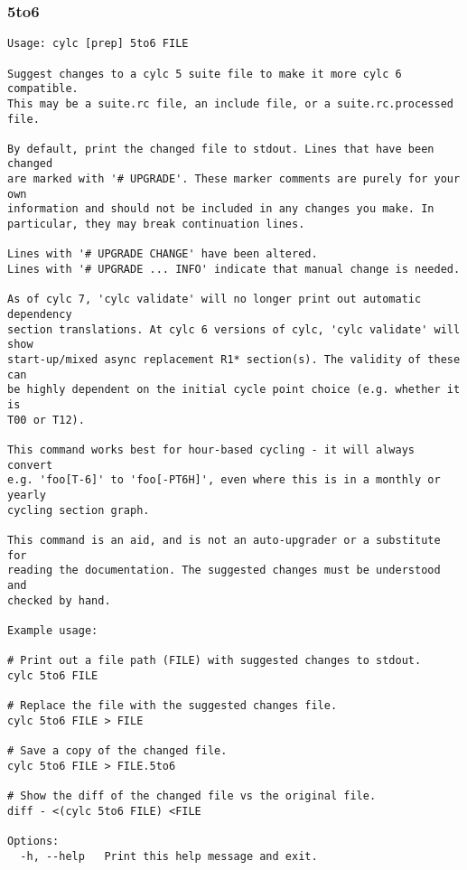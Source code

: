 \subsubsection{5to6}
\label{5to6}
\begin{lstlisting}
Usage: cylc [prep] 5to6 FILE

Suggest changes to a cylc 5 suite file to make it more cylc 6 compatible.
This may be a suite.rc file, an include file, or a suite.rc.processed file.

By default, print the changed file to stdout. Lines that have been changed
are marked with '# UPGRADE'. These marker comments are purely for your own
information and should not be included in any changes you make. In
particular, they may break continuation lines.

Lines with '# UPGRADE CHANGE' have been altered.
Lines with '# UPGRADE ... INFO' indicate that manual change is needed.

As of cylc 7, 'cylc validate' will no longer print out automatic dependency
section translations. At cylc 6 versions of cylc, 'cylc validate' will show
start-up/mixed async replacement R1* section(s). The validity of these can
be highly dependent on the initial cycle point choice (e.g. whether it is
T00 or T12).

This command works best for hour-based cycling - it will always convert
e.g. 'foo[T-6]' to 'foo[-PT6H]', even where this is in a monthly or yearly
cycling section graph.

This command is an aid, and is not an auto-upgrader or a substitute for
reading the documentation. The suggested changes must be understood and
checked by hand.

Example usage:

# Print out a file path (FILE) with suggested changes to stdout.
cylc 5to6 FILE

# Replace the file with the suggested changes file.
cylc 5to6 FILE > FILE

# Save a copy of the changed file.
cylc 5to6 FILE > FILE.5to6

# Show the diff of the changed file vs the original file.
diff - <(cylc 5to6 FILE) <FILE

Options:
  -h, --help   Print this help message and exit.
\end{lstlisting}
